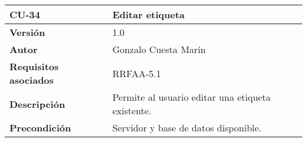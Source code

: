 \begin{longtable}[]{@{}ll@{}}
\toprule
\begin{minipage}[b]{0.24\columnwidth}\raggedright
\textbf{CU-34}\strut
\end{minipage} & \begin{minipage}[b]{0.70\columnwidth}\raggedright
\textbf{Editar etiqueta}\strut
\end{minipage}\tabularnewline
\midrule
\endhead
\begin{minipage}[t]{0.24\columnwidth}\raggedright
\textbf{Versión}\strut
\end{minipage} & \begin{minipage}[t]{0.70\columnwidth}\raggedright
1.0\strut
\end{minipage}\tabularnewline
\begin{minipage}[t]{0.24\columnwidth}\raggedright
\textbf{Autor}\strut
\end{minipage} & \begin{minipage}[t]{0.70\columnwidth}\raggedright
Gonzalo Cuesta Marín\strut
\end{minipage}\tabularnewline
\begin{minipage}[t]{0.24\columnwidth}\raggedright
\textbf{Requisitos asociados}\strut
\end{minipage} & \begin{minipage}[t]{0.70\columnwidth}\raggedright
RRFAA-5.1\strut
\end{minipage}\tabularnewline
\begin{minipage}[t]{0.24\columnwidth}\raggedright
\textbf{Descripción}\strut
\end{minipage} & \begin{minipage}[t]{0.70\columnwidth}\raggedright
Permite al usuario editar una etiqueta existente.\strut
\end{minipage}\tabularnewline
\begin{minipage}[t]{0.24\columnwidth}\raggedright
\textbf{Precondición}\strut
\end{minipage} & \begin{minipage}[t]{0.70\columnwidth}\raggedright
Servidor y base de datos disponible.


\end{minipage}
\end{longtable}
